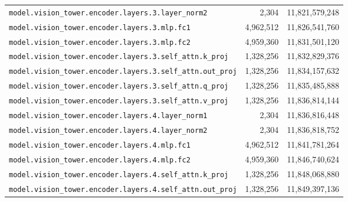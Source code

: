 \documentclass[10pt,a4paper]{article}
\theoremstyle{definition}
\begin{document}
\begin{appendices}
\begin{longtable}{p{9.5cm}rr}
\texttt{model.\allowbreak{}vision\_tower.\allowbreak{}encoder.\allowbreak{}layers.\allowbreak{}3.\allowbreak{}layer\_norm2} & 2,304 & 11,821,579,248 \\
\texttt{model.\allowbreak{}vision\_tower.\allowbreak{}encoder.\allowbreak{}layers.\allowbreak{}3.\allowbreak{}mlp.\allowbreak{}fc1} & 4,962,512 & 11,826,541,760 \\
\texttt{model.\allowbreak{}vision\_tower.\allowbreak{}encoder.\allowbreak{}layers.\allowbreak{}3.\allowbreak{}mlp.\allowbreak{}fc2} & 4,959,360 & 11,831,501,120 \\
\texttt{model.\allowbreak{}vision\_tower.\allowbreak{}encoder.\allowbreak{}layers.\allowbreak{}3.\allowbreak{}self\_attn.\allowbreak{}k\_proj} & 1,328,256 & 11,832,829,376 \\
\texttt{model.\allowbreak{}vision\_tower.\allowbreak{}encoder.\allowbreak{}layers.\allowbreak{}3.\allowbreak{}self\_attn.\allowbreak{}out\_proj} & 1,328,256 & 11,834,157,632 \\
\texttt{model.\allowbreak{}vision\_tower.\allowbreak{}encoder.\allowbreak{}layers.\allowbreak{}3.\allowbreak{}self\_attn.\allowbreak{}q\_proj} & 1,328,256 & 11,835,485,888 \\
\texttt{model.\allowbreak{}vision\_tower.\allowbreak{}encoder.\allowbreak{}layers.\allowbreak{}3.\allowbreak{}self\_attn.\allowbreak{}v\_proj} & 1,328,256 & 11,836,814,144 \\
\texttt{model.\allowbreak{}vision\_tower.\allowbreak{}encoder.\allowbreak{}layers.\allowbreak{}4.\allowbreak{}layer\_norm1} & 2,304 & 11,836,816,448 \\
\texttt{model.\allowbreak{}vision\_tower.\allowbreak{}encoder.\allowbreak{}layers.\allowbreak{}4.\allowbreak{}layer\_norm2} & 2,304 & 11,836,818,752 \\
\texttt{model.\allowbreak{}vision\_tower.\allowbreak{}encoder.\allowbreak{}layers.\allowbreak{}4.\allowbreak{}mlp.\allowbreak{}fc1} & 4,962,512 & 11,841,781,264 \\
\texttt{model.\allowbreak{}vision\_tower.\allowbreak{}encoder.\allowbreak{}layers.\allowbreak{}4.\allowbreak{}mlp.\allowbreak{}fc2} & 4,959,360 & 11,846,740,624 \\
\texttt{model.\allowbreak{}vision\_tower.\allowbreak{}encoder.\allowbreak{}layers.\allowbreak{}4.\allowbreak{}self\_attn.\allowbreak{}k\_proj} & 1,328,256 & 11,848,068,880 \\
\texttt{model.\allowbreak{}vision\_tower.\allowbreak{}encoder.\allowbreak{}layers.\allowbreak{}4.\allowbreak{}self\_attn.\allowbreak{}out\_proj} & 1,328,256 & 11,849,397,136 \\

\end{longtable}
\end{appendices}
\end{document}

